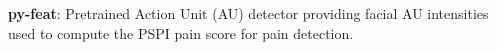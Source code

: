 \item \textbf{py-feat}: Pretrained Action Unit (AU) detector providing facial AU intensities used to compute the PSPI pain score for pain detection.
